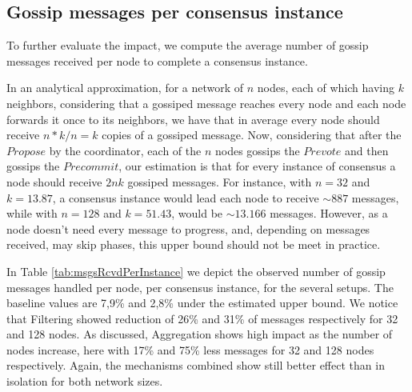 


\subsection{Gossip messages per consensus instance}

To further evaluate the impact, we compute the average number of gossip messages received per node to complete a consensus instance. 

In an analytical approximation, for a network of $n$ nodes, each of which having $k$ neighbors, 
considering that a gossiped message reaches every node and each node forwards it once to its neighbors, we have that in average every node should receive $n * k/n = k$ copies of a gossiped message.
%
Now, considering that after the $Propose$ by the coordinator, each of the $n$ nodes gossips the $Prevote$ and then gossips the $Precommit$, our estimation is that for every instance of consensus a node should receive $2nk$ gossiped messages. 
For instance, with $n =32$ and $k = 13.87$, a consensus instance would lead each node to receive 
$\sim 887$ messages, while with $n =128$ and $k = 51.43$, would be $\sim 13.166$ messages.
However, as a node doesn't need every message to progress, and, depending on messages received, may skip phases, this upper bound should not be meet in practice.

In Table \ref{tab:msgsRcvdPerInstance} we depict the observed number of gossip messages handled per node, per consensus instance, for the several setups.   The baseline values are 7,9\% and 2,8\% under the estimated upper bound.
We notice that Filtering showed reduction  of 26\% and 31\% of messages respectively for 32 and 128 nodes. As discussed, 
Aggregation shows high impact as the number of nodes increase, here with 17\% and 75\% less messages for 32 and 128 nodes respectively.  Again, the mechanisms combined show still better effect than in isolation for both network sizes.

